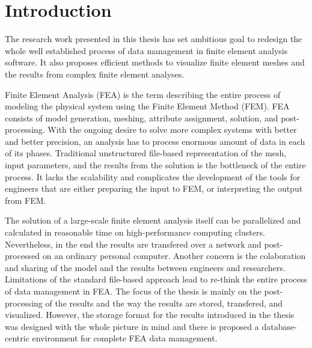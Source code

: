 \chapter{Introduction}

The research work presented in this thesis has set ambitious goal to redesign the whole well established process of data management in finite element analysis software. It also proposes efficient methods to visualize finite element meshes and the results from complex finite element analyses.

Finite Element Analysis (FEA) is the term describing the entire process of modeling the physical system using the Finite Element Method (FEM). FEA consists of model generation, meshing, attribute assignment, solution, and post-processing. With the ongoing desire to solve more complex systems with better and better precision, an analysis has to process enormous amount of data in each of its phases. Traditional unstructured file-based representation of the mesh, input parameters, and the results from the solution is the bottleneck of the entire process. It lacks the scalability and complicates the development of the tools for engineers that are either preparing the input to FEM, or interpreting the output from FEM.

The solution of a large-scale finite element analysis itself can be parallelized and calculated in reasonable time on high-performance computing clusters. Nevertheless, in the end the results are transfered over a network and post-processed on an ordinary personal computer. Another concern is the colaboration and sharing of the model and the results between engineers and researchers. Limitations of the standard file-based approach lead to re-think the entire process of data management in FEA. The focus of the thesis is mainly on the post-processing of the results and the way the results are stored, transfered, and visualized. However, the storage format for the results introduced in the thesis was designed with the whole picture in mind and there is proposed a database-centric environment for complete FEA data management.


